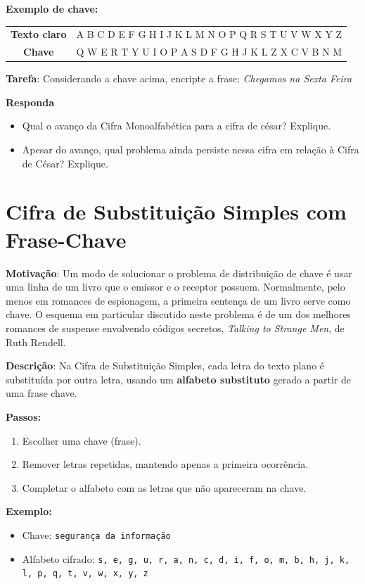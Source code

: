 \textbf{Exemplo de chave:}

\begin{tabular}{c|c}
    \textbf{Texto claro} & A B C D E F G H I J K L M N O P Q R S T U V W X Y Z \\
    \textbf{Chave}       & Q W E R T Y U I O P A S D F G H J K L Z X C V B N M \\
\end{tabular}

\textbf{Tarefa}: Considerando a chave acima, encripte a frase:  \textit{Chegamos na Sexta Feira}


\textbf{Responda}
\begin{itemize}
    \item Qual o avanço da Cifra Monoalfabética para a cifra de césar? Explique.



    \item Apesar do avanço, qual problema ainda persiste nessa cifra em relação à Cifra de César? Explique.


\end{itemize}


\section{Cifra de Substituição Simples com Frase-Chave}

\textbf{Motivação}:
Um modo de solucionar o problema de distribuição de chave é usar uma linha de um livro que o emissor e o receptor possuem. Normalmente, pelo menos em romances de espionagem, a primeira sentença de um livro serve como chave. O esquema em particular discutido neste problema é de um dos melhores romances de suspense envolvendo códigos secretos, \textit{Talking to Strange Men}, de Ruth Rendell.

\textbf{Descrição}:
Na Cifra de Substituição Simples, cada letra do texto plano é substituída por outra letra, usando um \textbf{alfabeto substituto} gerado a partir de uma frase chave.

\medskip
\textbf{Passos:}
\begin{enumerate}
    \item Escolher uma chave (frase).
    \item Remover letras repetidas, mantendo apenas a primeira ocorrência.
    \item Completar o alfabeto com as letras que não apareceram na chave.
\end{enumerate}

\medskip
\textbf{Exemplo:}
\begin{itemize}

    \item Chave: \texttt{segurança da informação}
    \item Alfabeto cifrado: \texttt{s, e, g, u, r, a, n, c, d, i, f, o, m, b, h, j, k, l, p, q, t, v, w, x, y, z}
\end{itemize}

